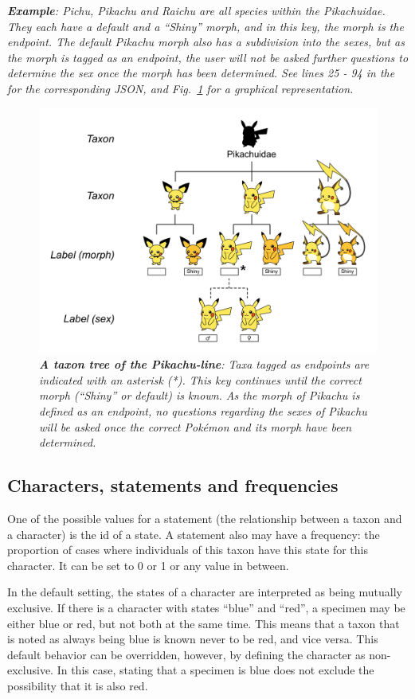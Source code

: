 \documentclass[10pt,letterpaper]{article}
\begin{document}
\textit{\textbf{Example}: Pichu, Pikachu and Raichu are all species within the Pikachuidae. They each have a default and a ``Shiny'' morph, and in this key, the morph is the endpoint. The default Pikachu morph also has a subdivision into the sexes, but as the morph is tagged as an endpoint, the user will not be asked further questions to determine the sex once the morph has been determined. See lines 25 - 94 in the  for the corresponding JSON, and Fig.~\ref{fig3} for a graphical representation.}


\begin{figure}[!h]
  \includegraphics[width=\textwidth]{Images/Fig3}
  \caption{\textit{\textbf{A taxon tree of the Pikachu-line}:
Taxa tagged as endpoints are indicated with an asterisk (*). This key continues until the correct morph (``Shiny'' or default) is known. As the morph of Pikachu is defined as an endpoint, no questions regarding the sexes of Pikachu will be asked once the correct Pokémon and its morph have been determined.
  }}
  \label{fig3}
\end{figure}
\subsection*{
Characters, statements and frequencies
}
One of the possible values for a statement (the relationship between a taxon and a character) is the id of a state. A statement also may have a frequency: the proportion of cases where individuals of this taxon have this state for this character. It can be set to 0 or 1 or any value in between.

In the default setting, the states of a character are interpreted as being mutually exclusive. If there is a character with states ``blue'' and ``red'', a specimen may be either blue or red, but not both at the same time. This means that a taxon that is noted as always being blue is known never to be red, and vice versa. This default behavior can be overridden, however, by defining the character as non-exclusive. In this case, stating that a specimen is blue does not exclude the possibility that it is also red.
\end{document}
